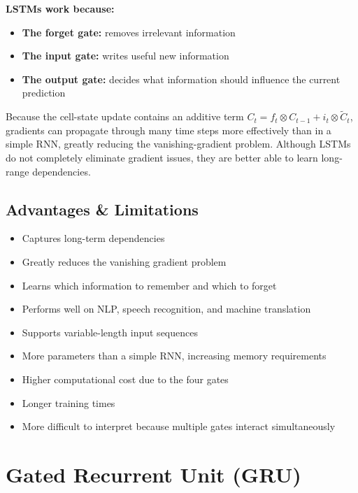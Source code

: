 \textbf{LSTMs work because:}
\begin{itemize}
    \item \textbf{The forget gate:} removes irrelevant information
    \item \textbf{The input gate:} writes useful new information
    \item \textbf{The output gate:} decides what information should influence the current prediction
\end{itemize}
Because the cell-state update contains an additive term $C_t = f_t \otimes C_{t-1} + i_t \otimes \tilde{C}_t$, gradients can propagate through many time steps more effectively than in a simple RNN, greatly reducing the vanishing-gradient problem. Although LSTMs do not completely eliminate gradient issues, they are better able to learn long-range dependencies.

\subsection{Advantages \& Limitations}

\begin{advbox}[Advantages]
\begin{itemize}
    \item Captures long-term dependencies
    \item Greatly reduces the vanishing gradient problem
    \item Learns which information to remember and which to forget
    \item Performs well on NLP, speech recognition, and machine translation
    \item Supports variable-length input sequences
\end{itemize}
\end{advbox}

\begin{advbox}[Limitations]
\begin{itemize}
    \item More parameters than a simple RNN, increasing memory requirements
    \item Higher computational cost due to the four gates
    \item Longer training times
    \item More difficult to interpret because multiple gates interact simultaneously
\end{itemize}
\end{advbox}

\section{Gated Recurrent Unit (GRU)}

